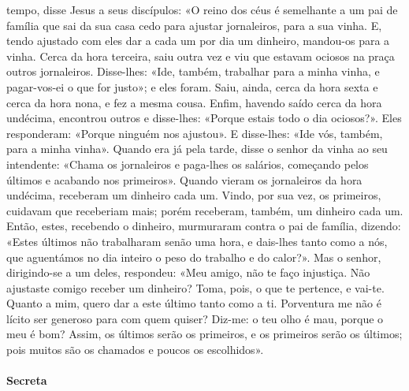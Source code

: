 \begin{paracol}{2}
{ tempo, disse Jesus a seus discípulos: «O reino dos céus é semelhante a um pai de família que sai da sua casa cedo para ajustar jornaleiros, para a sua vinha. E, tendo ajustado com eles dar a cada um por dia um dinheiro, mandou-os para a vinha. Cerca da hora terceira, saiu outra vez e viu que estavam ociosos na praça outros jornaleiros. Disse-lhes: «Ide, também, trabalhar para a minha vinha, e pagar-vos-ei o que for justo»; e eles foram. Saiu, ainda, cerca da hora sexta e cerca da hora nona, e fez a mesma cousa. Enfim, havendo saído cerca da hora undécima, encontrou outros e disse-lhes: «Porque estais todo o dia ociosos?». Eles responderam: «Porque ninguém nos ajustou». E disse-lhes: «Ide vós, também, para a minha vinha». Quando era já pela tarde, disse o senhor da vinha ao seu intendente: «Chama os jornaleiros e paga-lhes os salários, começando pelos últimos e acabando nos primeiros». Quando vieram os jornaleiros da hora undécima, receberam um dinheiro cada um. Vindo, por sua vez, os primeiros, cuidavam que receberiam mais; porém receberam, também, um dinheiro cada um. Então, estes, recebendo o dinheiro, murmuraram contra o pai de família, dizendo: «Estes últimos não trabalharam senão uma hora, e dais-lhes tanto como a nós, que aguentámos no dia inteiro o peso do trabalho e do calor?». Mas o senhor, dirigindo-se a um deles, respondeu: «Meu amigo, não te faço injustiça. Não ajustaste comigo receber um dinheiro? Toma, pois, o que te pertence, e vai-te. Quanto a mim, quero dar a este último tanto como a ti. Porventura me não é lícito ser generoso para com quem quiser? Diz-me: o teu olho é mau, porque o meu é bom? Assim, os últimos serão os primeiros, e os primeiros serão os últimos; pois muitos são os chamados e poucos os escolhidos».
}\end{paracol}

\begin{paracol}{2}\switchcolumn{}\end{paracol}

\paragraph{Secreta}
\begin{paracol}{2}\switchcolumn{}\end{paracol}

